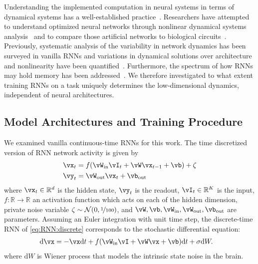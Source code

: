 \documentclass{article} %
\newcounter{ct}
\newcommand{\dm}[1]{\ensuremath{\mathrm{d}{#1}}} %
\newcommand{\win}{\vW_{\text{in}}}
\newcommand{\wout}{\vW_{\text{out}}}
\newcommand{\bout}{\vb_{\text{out}}}
\newcommand{\reals}{\mathbb{R}}
\theoremstyle{definition}
\theoremstyle{remark}
\begin{document}
Understanding the implemented computation in neural systems in terms of dynamical systems has a well-established practice~\citep{seung1996,sompolinsky1988}.
Researchers have attempted to understand optimized neural networks through nonlinear dynamical systems analysis~\citep{sussillo2013blackbox,sussillo2014,barak2013,driscoll2022,maheswaranathan2019universality,cueva2019headdirection,cueva2021continuous} and to compare those artificial networks to biological circuits~\citep{mante2013context,remington2018flexible,ghazizadeh2021slow}.
% 
Previously, systematic analysis of the variability in network dynamics has been surveyed in vanilla RNNs and variations in dynamical solutions over architecture and nonlinearity have been quantified~\citep{sussillo2013blackbox,mante2013context,yang2019task,maheswaranathan2019universality,driscoll2022}.
Furthermore, the spectrum of how RNNs may hold memory has been addressed~\citep{orhan2019diverse}.
We therefore investigated to what extent training RNNs on a task uniquely determines the low-dimensional dynamics, independent of neural architectures.

\subsection{Model Architectures and Training Procedure}
We examined vanilla continuous-time RNNs for this work.
The time discretized version of RNN network activity is given by
\begin{equation}
  \begin{aligned}
	\vx_t &= f(\win \vI_t + \vW \vx_{t-1} + \vb) + \zeta \label{eq:RNN:discrete}\\
	\vy_t &= \wout \vx_t + \bout
  \end{aligned}
\end{equation}
where $\vx_t \in \reals^d$ is the hidden state, 
$\vy_t $ is the readout, 
$\vI_t \in \reals^K$ is the input,
$f\colon \reals \to \reals$ an activation function which acts on each of the hidden dimension, 
private noise variable $\zeta\sim\mathcal{N}(0,\nicefrac{1}{100})$, and %
$\vW, \vb, \win, \wout, \bout$ are parameters.
Assuming an Euler integration with unit time step, the discrete-time RNN of \eqref{eq:RNN:discrete} corresponds to the stochastic differential equation:
\begin{align}
    \dm{\vx} &= -\vx\dm{t} + f(\win \vI + \vW \vx + \vb)\dm{t} + \sigma \dm{W}. \label{eq:RNN:continuous}
\end{align}
where $\dm{W}$ is Wiener process that models the intrinsic state noise in the brain.
\end{document}
